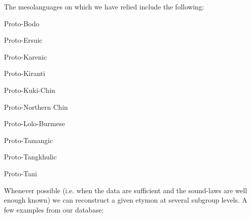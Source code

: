The mesolanguages on which we have relied include the following:

Proto-Bodo \citep{Burling1959}

Proto-Ersuic \citep{Yu2012}

Proto-Karenic \citep{Haudricourt1942-5,Haudricourt1975,Jones1961,Burling1969,Theraphan2013,Solnitinprep,Shintaniinprep}

Proto-Kiranti \citep{Michailovsky1991}

Proto-Kuki-Chin \citep{VanBik2009}

Proto-Northern Chin \citep{Button2011}

Proto-Lolo-Burmese \citep{Burling1968,Matisoff1969,Matisoff1972a,Matisoff1974b,Matisoff1978a,Matisoff1979b,Matisoff1986b,Matisoff2010f,Bradley1978}

Proto-Tamangic \citep{Mazaudon1978}

Proto-Tangkhulic \citep{Mortensen2010}

Proto-Tani \citep{Sun1993}



Whenever possible (i.e. when the data are sufficient and the sound-laws are well enough known) we can reconstruct a given etymon at several subgroup levels. A few examples from our database: 

